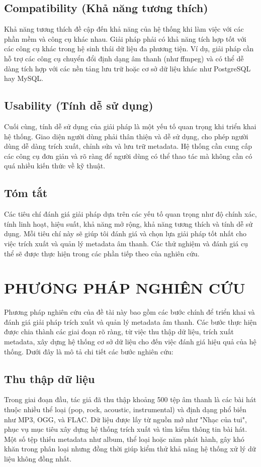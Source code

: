 \documentclass[conference]{IEEEtran}
\begin{document}
\subsection{Compatibility (Khả năng tương thích)}
Khả năng tương thích đề cập đến khả năng của hệ thống khi làm việc với các phần mềm và công cụ khác nhau. Giải pháp phải có khả năng tích hợp tốt với các công cụ khác trong hệ sinh thái dữ liệu đa phương tiện. Ví dụ, giải pháp cần hỗ trợ các công cụ chuyển đổi định dạng âm thanh (như ffmpeg) và có thể dễ dàng tích hợp với các nền tảng lưu trữ hoặc cơ sở dữ liệu khác như PostgreSQL hay MySQL.

\subsection{Usability (Tính dễ sử dụng)}
Cuối cùng, tính dễ sử dụng của giải pháp là một yếu tố quan trọng khi triển khai hệ thống. Giao diện người dùng phải thân thiện và dễ sử dụng, cho phép người dùng dễ dàng trích xuất, chỉnh sửa và lưu trữ metadata. Hệ thống cần cung cấp các công cụ đơn giản và rõ ràng để người dùng có thể thao tác mà không cần có quá nhiều kiến thức về kỹ thuật.

\subsection{Tóm tắt}
Các tiêu chí đánh giá giải pháp dựa trên các yếu tố quan trọng như độ chính xác, tính linh hoạt, hiệu suất, khả năng mở rộng, khả năng tương thích và tính dễ sử dụng. Mỗi tiêu chí này sẽ giúp tôi đánh giá và chọn lựa giải pháp tốt nhất cho việc trích xuất và quản lý metadata âm thanh. Các thử nghiệm và đánh giá cụ thể sẽ được thực hiện trong các phần tiếp theo của nghiên cứu.



\section{PHƯƠNG PHÁP NGHIÊN CỨU}

Phương pháp nghiên cứu của đề tài này bao gồm các bước chính để triển khai và đánh giá giải pháp trích xuất và quản lý metadata âm thanh. Các bước thực hiện được chia thành các giai đoạn rõ ràng, từ việc thu thập dữ liệu, trích xuất metadata, xây dựng hệ thống cơ sở dữ liệu cho đến việc đánh giá hiệu quả của hệ thống. Dưới đây là mô tả chi tiết các bước nghiên cứu:

\subsection{Thu thập dữ liệu}
Trong giai đoạn đầu, tác giả đã thu thập khoảng 500 tệp âm thanh là các bài hát thuộc nhiều thể loại (pop, rock, acoustic, instrumental) và định dạng phổ biến như MP3, OGG, và FLAC. Dữ liệu được lấy từ  nguồn mở như "Nhạc của tui", phục vụ mục tiêu xây dựng hệ thống trích xuất và tìm kiếm thông tin bài hát. Một số tệp thiếu metadata như album, thể loại hoặc năm phát hành, gây khó khăn trong phân loại nhưng đồng thời giúp kiểm thử khả năng hệ thống xử lý dữ liệu không đồng nhất.
\end{document}
